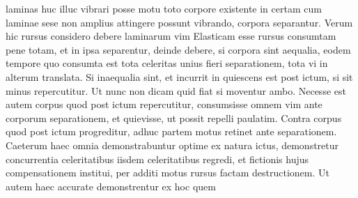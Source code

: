 %
laminas\protect{} huc illuc vibrari posse motu  
%
%
toto corpore existente in certam 
%
%
 cum %
laminae\protect{} sese non amplius attingere possunt vibrando, corpora separantur. 
\pend
%
\pstart Verum hic rursus considero debere laminarum 
%
%
 vim Elasticam\protect{} esse rursus consumtam pene totam, et in  
%
%
ipsa separentur, deinde debere, si corpora sint aequalia,%
\protect{} eodem tempore quo consumta est tota celeritas unius fieri  
%
separationem\protect{}, tota vi in alterum translata. Si inaequalia%
\protect{} sint, et  
%
%
incurrit in quiescens est 
%
post ictum\protect{}, si sit minus repercutitur. Ut nunc non dicam quid fiat si moventur ambo. 
%
Necesse est autem corpus quod post ictum\protect{} repercutitur,  
%
consumsisse omnem vim%
\protect{} ante corporum separationem\protect{}, et quievisse, 
%
 ut possit repelli paulatim. Contra corpus quod post ictum\protect{} progreditur,  
%
adhuc partem motus retinet ante separationem\protect{}. Caeterum haec  
%
omnia demonstrabuntur optime ex natura ictus\protect{}, 
%
%
 demonstretur 
%
%
 concurrentia celeritatibus iisdem celeritatibus regredi, et fictionis%
\protect{} hujus  
%
compensationem institui, per additi motus%
\protect{} rursus factam  
%
destructionem. Ut autem haec accurate demonstrentur ex hoc quem  
